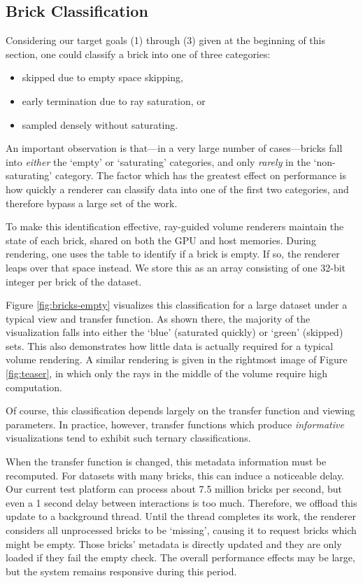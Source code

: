 \subsection{Brick Classification}
\label{sec:brick-classification}

Considering our target goals (1) through (3) given at the beginning of
this section, one could classify a brick into one of three categories:
\begin{itemize}
  \itemsep0em
  \item skipped due to empty space skipping,

  \item early termination due to ray saturation, or

  \item sampled densely without saturating.
\end{itemize}

An important observation is that---in a very large number of
cases---bricks fall into \emph{either} the `empty' or `saturating'
categories, and only \emph{rarely} in the `non-saturating' category.
The factor which has the greatest effect on performance is how quickly
a renderer can classify data into one of the first two categories, and
therefore bypass a large set of the work.

To make this identification effective, ray-guided volume renderers
maintain the state of each brick, shared on both the GPU and host
memories.  During rendering, one uses the table to identify if a brick
is empty.  If so, the renderer leaps over that space instead.  We store
this as an array consisting of one 32-bit integer per brick of the
dataset.

Figure \ref{fig:bricks-empty} visualizes this classification for a
large dataset under a typical view and transfer function.  As shown
there, the majority of the visualization falls into either the `blue'
(saturated quickly) or `green' (skipped) sets. This also demonstrates
how little data is actually required for a typical volume rendering.  A
similar rendering is given in the rightmost image of
Figure \ref{fig:teaser}, in which only the rays in the middle of the
volume require high computation.

Of course, this classification depends largely on the transfer function
and viewing parameters.  In practice, however, transfer functions which
produce \emph{informative} visualizations tend to exhibit such ternary
classifications.

When the transfer function is changed, this metadata information
must be recomputed.  For datasets with many bricks, this can induce
a noticeable delay.  Our current test platform can process about
7.5 million bricks per second, but even a 1 second delay between
interactions is too much.  Therefore, we offload this update to a
background thread.  Until the thread completes its work, the renderer
considers all unprocessed bricks to be `missing', causing it to request
bricks which might be empty.  Those bricks' metadata is directly
updated and they are only loaded if they fail the empty check.  The
overall performance effects may be large, but the system remains
responsive during this period.

